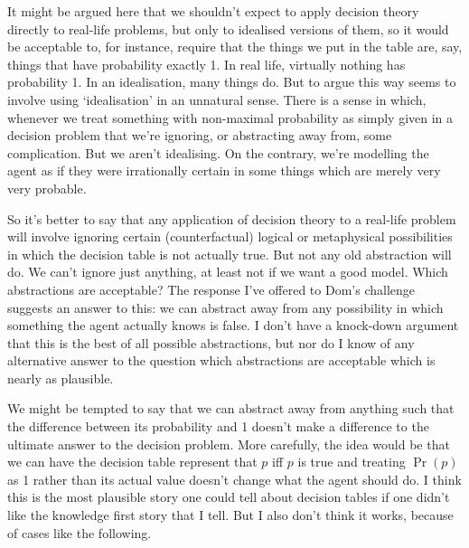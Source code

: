 \documentclass[11pt,]{book}
\begin{document}
It might be argued here that we shouldn't expect to apply decision theory directly to real-life problems, but only to idealised versions of them, so it would be acceptable to, for instance, require that the things we put in the table are, say, things that have probability exactly 1. In real life, virtually nothing has probability 1. In an idealisation, many things do. But to argue this way seems to involve using `idealisation' in an unnatural sense. There is a sense in which, whenever we treat something with non-maximal probability as simply given in a decision problem that we're ignoring, or abstracting away from, some complication. But we aren't idealising. On the contrary, we're modelling the agent as if they were irrationally certain in some things which are merely very very probable.

So it's better to say that any application of decision theory to a real-life problem will involve ignoring certain (counterfactual) logical or metaphysical possibilities in which the decision table is not actually true. But not any old abstraction will do. We can't ignore just anything, at least not if we want a good model. Which abstractions are acceptable? The response I've offered to Dom's challenge suggests an answer to this: we can abstract away from any possibility in which something the agent actually knows is false. I don't have a knock-down argument that this is the best of all possible abstractions, but nor do I know of any alternative answer to the question which abstractions are acceptable which is nearly as plausible.

We might be tempted to say that we can abstract away from anything such that the difference between its probability and 1 doesn't make a difference to the ultimate answer to the decision problem. More carefully, the idea would be that we can have the decision table represent that \(p\) iff \(p\) is true and treating \(\Pr(p)\) as 1 rather than its actual value doesn't change what the agent should do. I think this is the most plausible story one could tell about decision tables if one didn't like the knowledge first story that I tell. But I also don't think it works, because of cases like the following.
\end{document}
